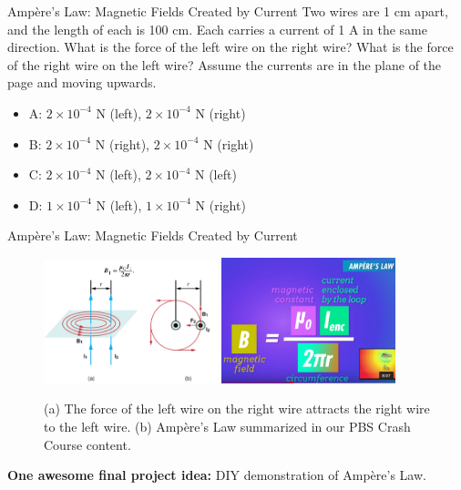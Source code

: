\documentclass{beamer}
\begin{document}
\begin{frame}{Amp\`{e}re's Law: Magnetic Fields Created by Current}
Two wires are 1 cm apart, and the length of each is 100 cm.  Each carries a current of 1 A in the same direction.  What is the force of the left wire on the right wire?  What is the force of the right wire on the left wire?  Assume the currents are in the plane of the page and moving upwards.
\begin{itemize}
\item A: $2\times 10^{-4}$ N (left), $2\times 10^{-4}$ N (right)
\item B: $2\times 10^{-4}$ N (right), $2\times 10^{-4}$ N (right)
\item C: $2\times 10^{-4}$ N (left), $2\times 10^{-4}$ N (left)
\item D: $1\times 10^{-4}$ N (left), $1\times 10^{-4}$ N (right)
\end{itemize}
\end{frame}

\begin{frame}{Amp\`{e}re's Law: Magnetic Fields Created by Current}
\begin{figure}
\centering
\includegraphics[width=0.45\textwidth]{figures/amp.png}
\includegraphics[width=0.45\textwidth]{figures/amplaw.png}
\caption{\label{fig:amp2} (a) The force of the left wire on the right wire attracts the right wire to the left wire.  (b)  Amp\`{e}re's Law summarized in our PBS Crash Course content.}
\end{figure}
\footnotesize
\textbf{One awesome final project idea:} DIY demonstration of Amp\`{e}re's Law.
\end{frame}
\end{document}
